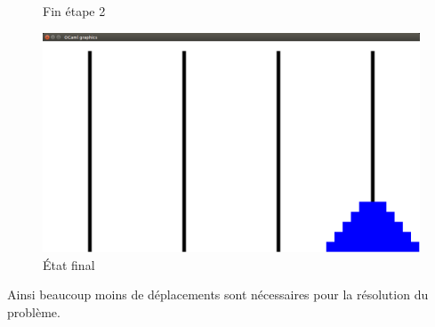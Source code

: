 \documentclass[a4paper, 11pt]{article}%
\begin{document}
\begin{figure}[!h]
			  \caption{Fin étape 2}\label{fig:hanoi_gen_mid2}
			\endminipage\hfill
			  \includegraphics[width=\linewidth]{hanoi_gen_end.png}
			  \caption{État final}\label{fig:hanoi_gen_end}
			\endminipage\hfill
		\end{figure}
		
		Ainsi beaucoup moins de déplacements sont nécessaires pour la résolution
		du problème.
\end{document}
